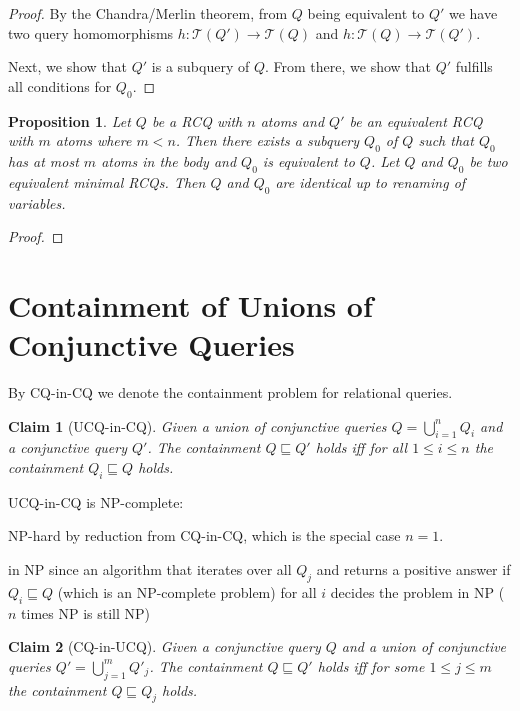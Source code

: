 \documentclass[a4paper,12pt]{article}
\newtheorem{claim}{Claim}
\newtheorem{prop}{Proposition}
\begin{document}
\begin{proof}
By the Chandra/Merlin theorem, from $Q$ being equivalent to $Q'$ we have two query homomorphisms $h : \mathcal{T}(Q') \rightarrow \mathcal{T}(Q)$ and $h : \mathcal{T}(Q) \rightarrow \mathcal{T}(Q')$.

Next, we show that $Q'$ is a subquery of $Q$. From there, we show that $Q'$ fulfills all conditions for $Q_0$.
\end{proof}

\begin{prop} Let $Q$ be a RCQ with $n$ atoms and $Q'$ be an equivalent RCQ with $m$ atoms where $m < n$. Then there exists a subquery $Q_0$ of $Q$ such that $Q_0$ has at most $m$ atoms in the body and $Q_0$ is equivalent to $Q$.
Let $Q$ and $Q_0$ be two equivalent minimal RCQs. Then $Q$ and $Q_0$
are identical up to renaming of variables.
\end{prop}

\begin{proof}
\end{proof}

\section{Containment of Unions of Conjunctive Queries}

By CQ-in-CQ we denote the containment problem for relational queries.

\begin{claim}[UCQ-in-CQ]
Given a union of conjunctive queries $Q = \bigcup_{i=1}^n Q_i$ and a conjunctive query $Q'$. The containment $Q \sqsubseteq Q'$ holds iff for all $1 \leq i \leq n$ the containment $Q_i \sqsubseteq Q$ holds.
\end{claim}

UCQ-in-CQ is NP-complete:

\begin{description}
\item{NP-hard} by reduction from CQ-in-CQ, which is the special case $n = 1$.
\item{in NP} since an algorithm that iterates over all $Q_j$ and returns a positive answer if $Q_i \sqsubseteq Q$ (which is an NP-complete problem) for all $i$ decides the problem in NP ($n$ times NP is still NP)
\end{description}

\begin{claim}[CQ-in-UCQ]
Given a conjunctive query $Q$ and a union of conjunctive queries $Q' = \bigcup_{j=1}^m Q'_j$. The containment $Q \sqsubseteq Q'$ holds iff for some $1 \leq j \leq m$ the containment $Q \sqsubseteq Q_j$ holds.
\end{claim}
\end{document}

